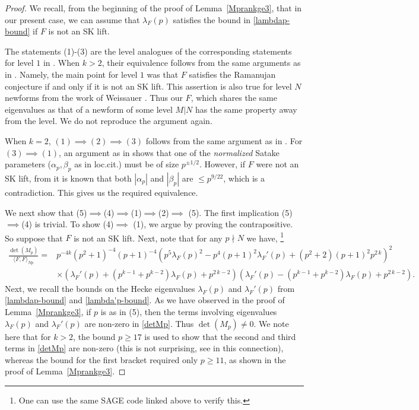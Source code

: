 \documentclass[11pt]{amsart}
\numberwithin{equation}{section}
\theoremstyle{plain}
\theoremstyle{definition}
\newcommand{\lan}{\langle }
\newcommand{\ran}{\rangle}
\begin{document}
\begin{proof}
We recall, from the beginning of the proof of Lemma~\ref{Mprankge3}, that in our present case, we can assume that $\lambda_F(p)$ satisfies the bound in \eqref{lambdap-bound} if $F$ is not an SK lift.


The statements (1)-(3) are the level analogues of the corresponding statements for level $1$ in \cite[Theorem 4.1]{farmer2013survey}. When $k>2$, their equivalence follows from the same arguments as in \cite{farmer2013survey}. Namely, the main point for level $1$ was that $F$ satisfies the Ramanujan conjecture if and only if it is not an SK lift. This assertion is also true for level $N$ newforms from the work of Weissauer \cite{weissauer}. Thus our $F$, 
which shares the same eigenvalues as that of a newform of some level $M|N$ has the same property away from the level. 
We do not reproduce the argument again.

When $k=2$, $(1)\implies(2)\implies (3)$ follows from the same argument as in \cite{farmer2013survey}. For $(3)\implies (1)$, an argument as in \cite{farmer2013survey} shows that one of the \textit{normalized} Satake parameters ($\alpha_p, \beta_p$ as in loc.cit.) must be of size $p^{\pm 1/2}$. However, if $F$ were not an SK lift, from \cite{kim2003functoriality} it is known that both $|\alpha_p|$ and $|\beta_p|$ are $\le p^{9/22}$, which is a contradiction. This gives us the required equivalence.

We next show that (5)$\implies$(4)$\implies$(1)$\implies$(2)$\implies$ (5). The first implication (5)$\implies$(4) is trivial. To show (4)$\implies$ (1), 
we argue by proving the contrapositive. So suppose that $F$ is not an SK lift.
Next, note that for any $p\nmid N$ we have, 
\footnote{One can use the same SAGE code linked above to verify this.}
\begin{equation}\label{detMp}
        \begin{split}
            \frac{\det(M_p)}{\lan F, F\ran_{Np}}=&p^{-4k}{\left(p^{2} + 1\right)}^{-4} {\left(p + 1\right)}^{-4}\left(p^{5} \lambda_F(p)^{2} - p^4(p+1)^2\lambda_F'(p) + \left(p^{2} + 2\right) {\left(p + 1\right)}^{2} p^{2 \, k}\right)^{2}\\
    &\times\left( \lambda_F'(p) + (p^{k -1}+ p^{k-2}) \lambda_F(p) + p^{2 \, k-2}\right){\left(\lambda_F'(p) - (p^{k - 1} + p^{k-2}) \lambda_F(p) + p^{2 \, k-2}\right)}.
        \end{split}
    \end{equation}
 Next, we recall the bounds on the Hecke eigenvalues $\lambda_F(p)$ and $\lambda_F'(p)$ from \eqref{lambdap-bound} and \eqref{lambda'p-bound}.
    As we have observed in the proof of Lemma~\ref{Mprankge3}, if $p$ is as in (5), then the terms involving eigenvalues $\lambda_F(p)$ and $\lambda_F'(p)$ are non-zero in \eqref{detMp}. Thus $\det(M_p)\neq 0$. We note here that for $k>2$, the bound $p\ge 17$ is used to show that the second and third terms in \eqref{detMp} are non-zero (this is not surprising, see \cite[Theorem 4.1]{farmer2013survey} in this connection), whereas the bound for the first bracket required only $p \ge 11$, as shown in the proof of Lemma~\ref{Mprankge3}.
    

\end{proof}
\end{document}
